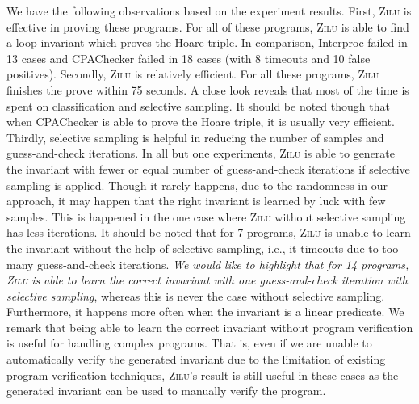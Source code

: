 We have the following observations based on the experiment results. First, \textsc{Zilu} is effective in proving these programs. For all of these programs, \textsc{Zilu} is able to find a loop invariant which proves the Hoare triple. In comparison, Interproc failed in 13 cases and CPAChecker failed in 18 cases (with 8 timeouts and 10 false positives). Secondly, \textsc{Zilu} is relatively efficient. For all these programs, \textsc{Zilu} finishes the prove within 75 seconds. A close look reveals that most of the time is spent on classification and selective sampling. It should be noted though that when CPAChecker is able to prove the Hoare triple, it is usually very efficient. Thirdly, selective sampling is helpful in reducing the number of samples and guess-and-check iterations. In all but one experiments, \textsc{Zilu} is able to generate the invariant with fewer or equal number of guess-and-check iterations if selective sampling is applied. Though it rarely happens, due to the randomness in our approach, it may happen that the right invariant is learned by luck with few samples. This is happened in the one case where \textsc{Zilu} without selective sampling has less iterations. It should be noted that for 7 programs, \textsc{Zilu} is unable to learn the invariant without the help of selective sampling, i.e., it timeouts due to too many guess-and-check iterations.
\emph{We would like to highlight that for 14 programs, \textsc{Zilu} is able to learn the correct invariant with one guess-and-check iteration with selective sampling}, whereas this is never the case without selective sampling. Furthermore, it happens more often when the invariant is a linear predicate. We remark that being able to learn the correct invariant without program verification is useful for handling complex programs. That is, even if we are unable to automatically verify the generated invariant due to the limitation of existing program verification techniques, \textsc{Zilu}'s result is still useful in these cases as the generated invariant can be used to manually verify the program.




